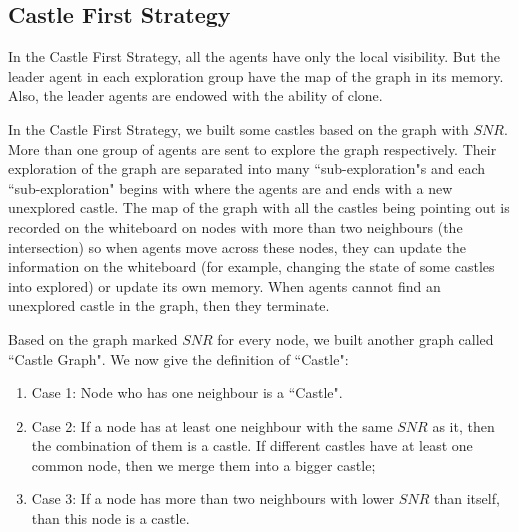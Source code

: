 
               
\subsection{Castle First Strategy}
In the Castle First Strategy, all the agents have only the local visibility. But the leader agent in each exploration group have the map of the graph in its memory. Also, the leader agents are endowed with the ability of clone.

In the Castle First Strategy, we built some castles based on the graph with $SNR$. More than one group of agents are sent to explore the graph respectively. Their exploration of the graph are separated into many ``sub-exploration"s and each ``sub-exploration" begins with where the agents are and ends with a new unexplored castle. The map of the graph with all the castles being pointing out is recorded on the whiteboard on nodes with more than two neighbours (the intersection) so when agents move across these nodes, they can update the information on the whiteboard (for example, changing the state of some castles into explored) or update its own memory. When agents cannot find an unexplored castle in the graph, then they terminate. 

Based on the graph marked $SNR$ for every node, we built another graph called ``Castle Graph". 
We now give the definition of ``Castle":
\begin{enumerate}
\item Case 1: Node who has one neighbour is a ``Castle".
\item Case 2: If a node has at least one neighbour with the same $SNR$ as it, then the combination of them is a castle. If different castles have at least one common node, then we merge them into a bigger castle;
\item Case 3: If a node has more than two neighbours with lower $SNR$ than itself, than this node is a castle.
\end{enumerate}

